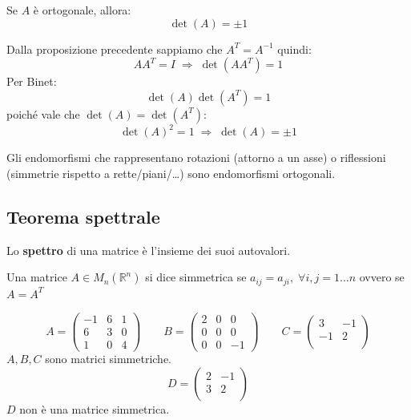 \documentclass[
  a4paper,
]{article}
\begin{document}
\begin{propositionbox}
Se \(A\) è ortogonale, allora: \[
\det(A) = \pm 1
\]
\end{propositionbox}

\begin{proofbox}
Dalla proposizione precedente sappiamo che \(A^T = A^{-1}\) quindi: \[
AA^T = I \;\Longrightarrow\; \det(AA^T) = 1
\] Per Binet: \[
\det(A)\det(A^T) = 1
\] poiché vale che \(\det(A) = \det(A^T)\): \[
\det(A)^2 = 1 \;\Longrightarrow\; \det(A) = \pm 1
\]
\end{proofbox}

\begin{observationbox}
Gli endomorfismi che rappresentano rotazioni (attorno a un asse) o
riflessioni (simmetrie rispetto a rette/piani/\ldots) sono endomorfismi
ortogonali.
\end{observationbox}

\hypertarget{teorema-spettrale}{%
\subsection{Teorema spettrale}\label{teorema-spettrale}}

\begin{definitionbox}
Lo \textbf{spettro} di una matrice è l'insieme dei suoi autovalori.
\end{definitionbox}

\begin{definitionbox}
Una matrice \(A \in M_n (\mathbb{R}^n)\) si dice simmetrica se
\(a_{ij} = a_{ji}, \; \forall i, j = 1 \dots n\) ovvero se \(A = A^T\)
\end{definitionbox}

\begin{examplebox}
\[
A=
\begin{pmatrix}
-1 & 6 & 1\\
6 & 3 & 0\\
1 & 0 & 4
\end{pmatrix}
\qquad
B=
\begin{pmatrix}
2 & 0 & 0\\
0 & 0 & 0\\
0 & 0 & -1
\end{pmatrix}
\qquad
C=
\begin{pmatrix}
3 & -1 \\
-1 & 2\\
\end{pmatrix}
\] \(A, B, C\) sono matrici simmetriche. \[
D=
\begin{pmatrix}
2 & -1 \\
3 & 2\\
\end{pmatrix}
\] \(D\) non è una matrice simmetrica.
\end{examplebox}
\end{document}
